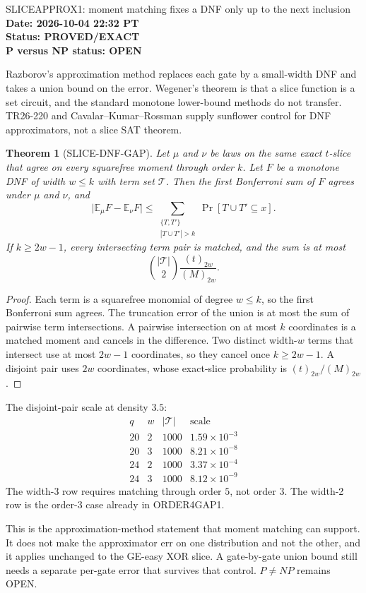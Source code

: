 \documentclass[11pt]{article}
\newtheorem{theorem}{Theorem}
\begin{document}
\begin{center}
{\Large SLICEAPPROX1: moment matching fixes a DNF only up to the next inclusion}\\[4pt]
\textbf{Date: 2026-10-04 22:32 PT}\\
\textbf{Status: PROVED/EXACT}\\
\textbf{P versus NP status: OPEN}
\end{center}

Razborov's approximation method replaces each gate by a small-width DNF and takes a union bound on the error. Wegener's theorem is that a slice function is a set circuit, and the standard monotone lower-bound methods do not transfer. TR26-220 and Cavalar--Kumar--Rossman supply sunflower control for DNF approximators, not a slice SAT theorem.

\begin{theorem}[SLICE-DNF-GAP]
Let $\mu$ and $\nu$ be laws on the same exact $t$-slice that agree on every squarefree moment through order $k$. Let $F$ be a monotone DNF of width $w\le k$ with term set $\mathcal T$. Then the first Bonferroni sum of $F$ agrees under $\mu$ and $\nu$, and
\[
\bigl|\mathbb E_\mu F-\mathbb E_\nu F\bigr|
\le
\sum_{\substack{\{T,T'\}\\|T\cup T'|>k}}
\Pr[T\cup T'\subseteq x].
\]
If $k\ge 2w-1$, every intersecting term pair is matched, and the sum is at most
\[
\binom{|\mathcal T|}{2}\frac{(t)_{2w}}{(M)_{2w}}.
\]
\end{theorem}
\begin{proof}
Each term is a squarefree monomial of degree $w\le k$, so the first Bonferroni sum agrees. The truncation error of the union is at most the sum of pairwise term intersections. A pairwise intersection on at most $k$ coordinates is a matched moment and cancels in the difference. Two distinct width-$w$ terms that intersect use at most $2w-1$ coordinates, so they cancel once $k\ge 2w-1$. A disjoint pair uses $2w$ coordinates, whose exact-slice probability is $(t)_{2w}/(M)_{2w}$.
\end{proof}

The disjoint-pair scale at density $3.5$:
\[
\begin{array}{c|c|c|c}
q&w&|\mathcal T|&\text{scale}\\
\hline
20&2&1000&1.59\times 10^{-3}\\
20&3&1000&8.21\times 10^{-8}\\
24&2&1000&3.37\times 10^{-4}\\
24&3&1000&8.12\times 10^{-9}
\end{array}
\]
The width-3 row requires matching through order $5$, not order $3$. The width-2 row is the order-3 case already in ORDER4GAP1.

This is the approximation-method statement that moment matching can support. It does not make the approximator err on one distribution and not the other, and it applies unchanged to the GE-easy XOR slice. A gate-by-gate union bound still needs a separate per-gate error that survives that control. $P\ne NP$ remains OPEN.
\end{document}
